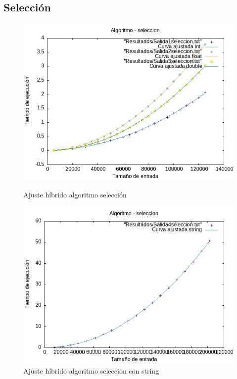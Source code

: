 \documentclass[11pt]{article}
\begin{document}
\subsection*{Selección}
\begin{figure}[H]
    \begin{minipage}{0.5\textwidth}
        \centering
        \includegraphics[width=\linewidth]{assets/AjusteHibrido_latex/Hibridoseleccion/seleccion_hib.png}
        \caption{Ajuste híbrido algoritmo selección}
        \label{fig:seleccion}
    \end{minipage}%
    \begin{minipage}{0.5\textwidth}
        \centering
        \includegraphics[width=\linewidth]{assets/AjusteHibrido_latex/Hibridoseleccion/seleccionstring_hib.png}
        \caption{Ajuste híbrido algoritmo seleccion con string}
        \label{fig:Seleccion}
    \end{minipage}
\end{figure}
\end{document}
